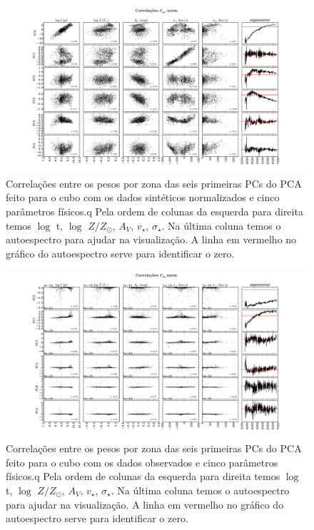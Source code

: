 \begin{figure}
    \includegraphics[width=1.4\textwidth, angle=-90]{figuras/K0277-correl-f_syn_norm-PCvsPhys.pdf}
	\caption[Correlações PCs vs. par\^ametros f\'isicos - $F_{syn}$ norm.]
    {Correlações entre os pesos por zona das seis primeiras PCs do PCA feito para o cubo com os dados sintéticos
    normalizados e cinco parâmetros físicos.q Pela ordem de colunas da esquerda para direita temos $\log$ t, $\log$ $Z /
    Z_{\odot}$, $A_V$, $v_{\star}$, $\sigma_{\star}$. Na última coluna temos o autoespectro para ajudar na visualização.
    A linha em vermelho no gráfico do autoespectro serve para identificar o zero.}
    \label{fig:cap4:K0277correfsynorm}
\end{figure}

\begin{figure}
    \includegraphics[width=1.4\textwidth, angle=-90]{figuras/K0277-correl-f_obs-PCvsPhys.pdf}
	\caption[Correlações PCs vs. par\^ametros f\'isicos - $F_{obs}$.]
    {Correlações entre os pesos por zona das seis primeiras PCs do PCA feito para o cubo com os dados observados e cinco
    parâmetros físicos.q Pela ordem de colunas da esquerda para direita temos $\log$ t, $\log$ $Z / Z_{\odot}$, $A_V$,
    $v_{\star}$, $\sigma_{\star}$. Na última coluna temos o autoespectro para ajudar na visualização. A linha em
    vermelho no gráfico do autoespectro serve para identificar o zero.}
    \label{fig:cap4:K0277correfobs}
\end{figure}

